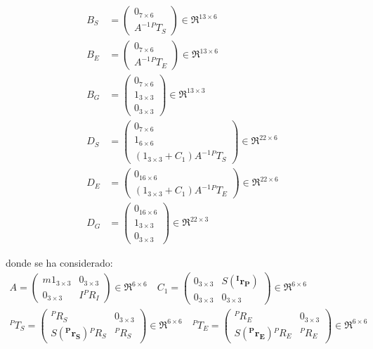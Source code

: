 \begin{subequations}
\begin{align}
	B_S &= \begin{pmatrix} 
			0_{7\times6} \\ A^{-1} {^PT_S}
		  \end{pmatrix} \in \Re^{13\times6} \\
	B_E &= \begin{pmatrix} 
			0_{7\times6} \\ A^{-1} {^PT_E}
		  \end{pmatrix} \in \Re^{13\times6} \\
	B_G &= \begin{pmatrix} 
			0_{7\times6} \\ 1_{3\times3} \\ 0_{3\times3}
		  \end{pmatrix} \in \Re^{13\times3} \\
	D_S &= \begin{pmatrix} 
			0_{7\times6} \\ 1_{6\times6} \\ (1_{3\times3} + C_1)A^{-1} {^PT_S}
		  \end{pmatrix} \in \Re^{22\times6} \\
	D_E &= \begin{pmatrix} 
			0_{16\times6} \\ (1_{3\times3} + C_1)A^{-1} {^PT_E}
		  \end{pmatrix} \in \Re^{22\times6} \\
	D_G &= \begin{pmatrix} 
			0_{16\times6} \\ 1_{3\times3} \\ 0_{3\times3}
		  \end{pmatrix} \in \Re^{22\times3} 
\end{align}
\end{subequations}

\noindent
donde se ha considerado: \\

\[
\begin{split}
	A = \begin{pmatrix}
		m1_{3\times3} & 0_{3\times3} \\ 0_{3\times3} & I {^PR_I}
	\end{pmatrix} \in \Re^{6\times6} \quad 
	C_1 = \begin{pmatrix}
		0_{3\times3} & S(\boldsymbol{^Ir_P}) \\ 0_{3\times3} & 0_{3\times3}
	\end{pmatrix} \in \Re^{6\times6} \\
	^PT_S = \begin{pmatrix}
		^PR_S & 0_{3\times3} \\ S(\boldsymbol{^Pr_S}){^PR_S} & ^PR_S
	\end{pmatrix} \in \Re^{6\times6} \quad
	^PT_E = \begin{pmatrix}
		^PR_E & 0_{3\times3} \\ S(\boldsymbol{^Pr_E}){^PR_E} & ^PR_E
	\end{pmatrix} \in \Re^{6\times6}
\end{split}
\]

